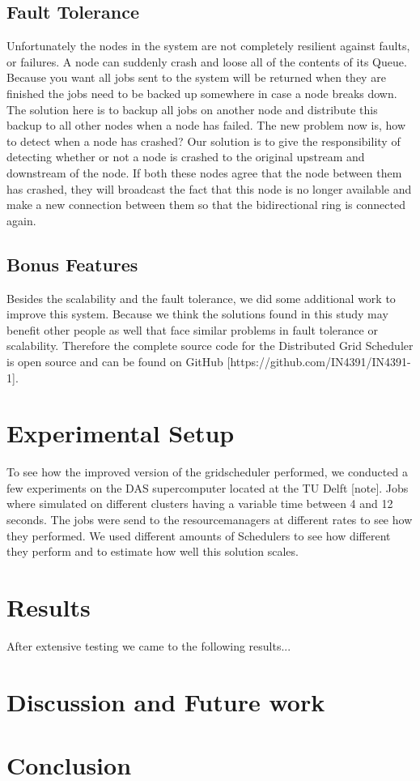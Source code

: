 \documentclass[twocolumn,a4paper]{article}
\begin{document}
\subsection{Fault Tolerance}
Unfortunately the nodes in the system are not completely resilient against faults, or failures. A node can suddenly crash and loose all of the contents of its Queue. Because you want all jobs sent to the system will be returned when they are finished the jobs need to be backed up somewhere in case a node breaks down. The solution here is to backup all jobs on another node and distribute this backup to all other nodes when a node has failed. The new problem now is, how to detect when a node has crashed? Our solution is to give the responsibility of detecting whether or not a node is crashed to the original upstream and downstream of the node. If both these nodes agree that the node between them has crashed, they will broadcast the fact that this node is no longer available and make a new connection between them so that the bidirectional ring is connected again.

\subsection{Bonus Features}
Besides the scalability and the fault tolerance, we did some additional work to improve this system. Because we think the solutions found in this study may benefit other people as well that face similar problems in fault tolerance or scalability. Therefore the complete source code for the Distributed Grid Scheduler is open source and can be found on GitHub [https://github.com/IN4391/IN4391-1].

\section{Experimental Setup}
To see how the improved version of the gridscheduler performed, we conducted a few experiments on the DAS supercomputer located at the TU Delft [note]. Jobs where simulated on different clusters having a variable time between 4 and 12 seconds. The jobs were send to the resourcemanagers at different rates to see how they performed. We used different amounts of Schedulers to see how different they perform and to estimate how well this solution scales.

\section{Results}
After extensive testing we came to the following results...

\section{Discussion and Future work}


\section{Conclusion}
\end{document}
